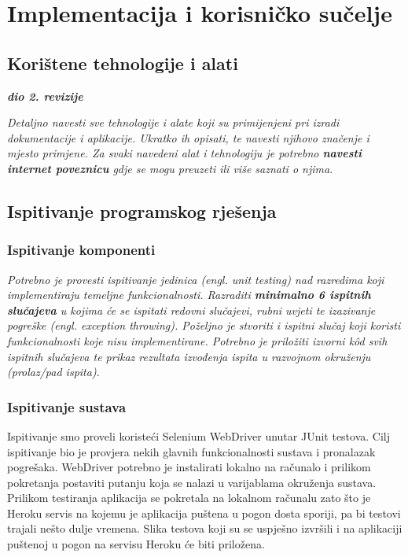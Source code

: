 \chapter{Implementacija i korisničko sučelje}
		
		
		\section{Korištene tehnologije i alati}
		
			\textbf{\textit{dio 2. revizije}}
			
			 \textit{Detaljno navesti sve tehnologije i alate koji su primijenjeni pri izradi dokumentacije i aplikacije. Ukratko ih opisati, te navesti njihovo značenje i mjesto primjene. Za svaki navedeni alat i tehnologiju je potrebno \textbf{navesti internet poveznicu} gdje se mogu preuzeti ili više saznati o njima}.
			 		
			\eject 
		
	
		\section{Ispitivanje programskog rješenja}
			
			\subsection{Ispitivanje komponenti}
			\textit{Potrebno je provesti ispitivanje jedinica (engl. unit testing) nad razredima koji implementiraju temeljne funkcionalnosti. Razraditi \textbf{minimalno 6 ispitnih slučajeva} u kojima će se ispitati redovni slučajevi, rubni uvjeti te izazivanje pogreške (engl. exception throwing). Poželjno je stvoriti i ispitni slučaj koji koristi funkcionalnosti koje nisu implementirane. Potrebno je priložiti izvorni kôd svih ispitnih slučajeva te prikaz rezultata izvođenja ispita u razvojnom okruženju (prolaz/pad ispita). }
			
			
			
			\subsection{Ispitivanje sustava}
			
			  Ispitivanje smo proveli koristeći Selenium WebDriver unutar JUnit testova. Cilj ispitivanje bio je provjera nekih glavnih funkcionalnosti sustava i pronalazak pogrešaka. WebDriver potrebno je instalirati lokalno na računalo i prilikom pokretanja postaviti putanju koja se nalazi u varijablama okruženja sustava. Prilikom testiranja aplikacija se pokretala na lokalnom računalu zato što je Heroku servis na kojemu je aplikacija puštena u pogon dosta sporiji, pa bi testovi trajali nešto dulje vremena.
			  Slika testova koji su se uspješno izvršili i na aplikaciji puštenoj u pogon na servisu Heroku će biti priložena.\\
	
